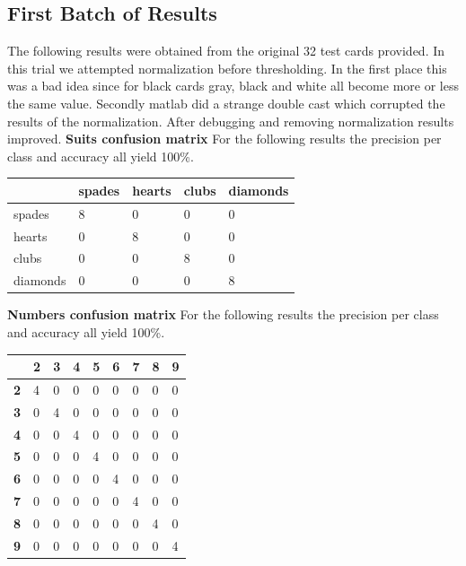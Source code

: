 \documentclass[11pt]{article}
\theoremstyle{plain}
\theoremstyle{definition}
\begin{document}
\subsection{First Batch of Results}
The following results were obtained from the original 32 test cards provided. In this trial we attempted normalization before thresholding. In the first place this was a bad idea since for black cards gray, black and white all become more or less the same value. Secondly matlab did a strange double cast which corrupted the results of the normalization. After debugging and removing normalization results improved.
\newline
\newline
{\bf Suits confusion matrix}
\newline
For the following results the precision per class and accuracy all yield 100\%.
 \begin{center}
    \begin{tabular}{| l | l |  l | l | p{2cm} |}
    \hline
      & spades & hearts & clubs &diamonds \\ \hline
 	   spades & 8 & 0 & 0 &0\\ \hline
 	   hearts & 0 & 8 & 0 &0\\ \hline
 	   clubs & 0 & 0 & 8 &0\\ \hline
 	   diamonds & 0 & 0 & 0&8\\ \hline
    \end{tabular}
 \end{center}
{\bf Numbers confusion matrix}
\newline
For the following results the precision per class and accuracy all yield 100\%.
\begin{center}
    \begin{tabular}{| l | l |  l | l |  l | l |  l | l |p{1cm} |}
    \hline
      & {\bf2} & {\bf3} & {\bf4} &{\bf5} &{\bf6} &{\bf7}&{\bf8}&{\bf9}\\ \hline
 	   {\bf2} & 4 & 0 &0  & 0 & 0 &  0&0 &0\\ \hline
 	   {\bf3} & 0 & 4 &  0& 0 &0  & 0 &0 &0\\ \hline
 	   {\bf4} & 0 & 0 & 4 &  0& 0 &  0& 0&0\\ \hline
 	   {\bf5} & 0 & 0 & 0 & 4 &  0& 0 & 0&0\\ \hline
 	   {\bf6} & 0 & 0 & 0 & 0 &4  & 0 &0 &0\\ \hline
 	   {\bf7} & 0 & 0 & 0 & 0 & 0 &4  & 0&0\\ \hline
 	   {\bf8} & 0 & 0 & 0 & 0 & 0 &0  &4 &0\\ \hline
 	   {\bf9 }& 0 & 0 & 0 & 0 & 0 &0  &0 &4\\ \hline
    \end{tabular}
 \end{center}
\end{document}
